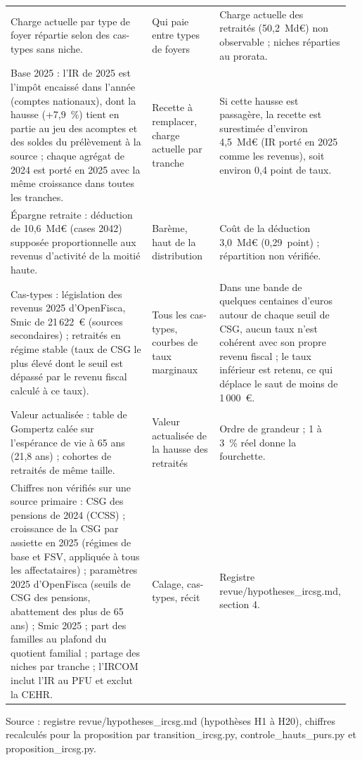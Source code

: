 \documentclass[11pt,a4paper]{article}
\begin{document}
\begin{table}[!htbp]
\begin{tabular}{@{}p{0.43\linewidth}p{0.2\linewidth}p{0.33\linewidth}@{}}
Charge actuelle par type de foyer répartie selon des cas-types sans niche. & Qui paie entre types de foyers & Charge actuelle des retraités (50,2~Md€) non observable ; niches réparties au prorata. \\[2pt]
Base 2025 : l'IR de 2025 est l'impôt encaissé dans l'année (comptes nationaux), dont la hausse (+7,9~\%) tient en partie au jeu des acomptes et des soldes du prélèvement à la source ; chaque agrégat de 2024 est porté en 2025 avec la même croissance dans toutes les tranches. & Recette à remplacer, charge actuelle par tranche & Si cette hausse est passagère, la recette est surestimée d'environ 4,5~Md€ (IR porté en 2025 comme les revenus), soit environ 0,4 point de taux. \\[2pt]
Épargne retraite : déduction de 10,6~Md€ (cases 2042) supposée proportionnelle aux revenus d'activité de la moitié haute. & Barème, haut de la distribution & Coût de la déduction 3,0~Md€ (0,29~point) ; répartition non vérifiée. \\[2pt]
Cas-types : législation des revenus 2025 d'OpenFisca, Smic de 21\,622~€ (sources secondaires) ; retraités en régime stable (taux de CSG le plus élevé dont le seuil est dépassé par le revenu fiscal calculé à ce taux). & Tous les cas-types, courbes de taux marginaux & Dans une bande de quelques centaines d'euros autour de chaque seuil de CSG, aucun taux n'est cohérent avec son propre revenu fiscal ; le taux inférieur est retenu, ce qui déplace le saut de moins de 1\,000~€. \\[2pt]
Valeur actualisée : table de Gompertz calée sur l'espérance de vie à 65 ans (21,8 ans) ; cohortes de retraités de même taille. & Valeur actualisée de la hausse des retraités & Ordre de grandeur ; 1 à 3~\% réel donne la fourchette. \\[2pt]
Chiffres non vérifiés sur une source primaire : CSG des pensions de 2024 (CCSS) ; croissance de la CSG par assiette en 2025 (régimes de base et FSV, appliquée à tous les affectataires) ; paramètres 2025 d'OpenFisca (seuils de CSG des pensions, abattement des plus de 65 ans) ; Smic 2025 ; part des familles au plafond du quotient familial ; partage des niches par tranche ; l'IRCOM inclut l'IR au PFU et exclut la CEHR. & Calage, cas-types, récit & Registre revue/hypotheses\_ircsg.md, section 4. \\[2pt]
\bottomrule
\end{tabular}
\par\vspace{3pt}\parbox{\linewidth}{\raggedright\scriptsize\color{encre}
Source : registre revue/hypotheses\_ircsg.md (hypothèses H1 à H20), chiffres recalculés pour la proposition par transition\_ircsg.py, controle\_hauts\_purs.py et proposition\_ircsg.py.}
\end{table}
\end{document}
